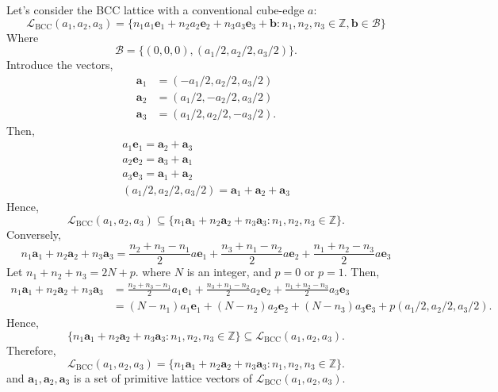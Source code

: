 \documentclass[a4paper,11pt]{article}
\begin{document}
Let's consider the BCC lattice with a conventional cube-edge $a$:
\begin{equation}
    \mathcal L_{\mathrm{BCC}}(a_1, a_2, a_3) = \{n_1a_1\mathbf e_1+n_2a_2\mathbf e_2+n_3a_3\mathbf e_3 + \mathbf b:n_1, n_2, n_3\in \mathbb Z, \mathbf b\in\mathcal B\}
\end{equation}
Where
\begin{equation}
    \mathcal B=\{(0, 0, 0), (a_1/2, a_2/2, a_3/2)\}.
\end{equation}
Introduce the vectors,
\begin{align}
    \mathbf a_1&=(-a_1/2, a_2/2, a_3/2)\\
    \mathbf a_2&=(a_1/2, -a_2/2, a_3/2)\\
    \mathbf a_3&=(a_1/2, a_2/2, -a_3/2).
\end{align}
Then,
\begin{gather}
    a_1\mathbf e_1 = \mathbf a_2 + \mathbf a_3\\
    a_2\mathbf e_2 = \mathbf a_3 + \mathbf a_1\\
    a_3\mathbf e_3 = \mathbf a_1 + \mathbf a_2\\
    (a_1/2, a_2/2, a_3/2) = \mathbf a_1 + \mathbf a_2 + \mathbf a_3
\end{gather}
Hence,
\begin{equation}
    \mathcal L_{\mathrm{BCC}}(a_1, a_2, a_3)\subseteq \{n_1\mathbf a_1+n_2\mathbf a_2+n_3\mathbf a_3:n_1, n_2, n_3\in\mathbb Z\}.
\end{equation}
Conversely,
\begin{equation}
    n_1\mathbf a_1+n_2\mathbf a_2+n_3\mathbf a_3
    =\frac{n_2 + n_3 - n_1}{2}a\mathbf e_1+\frac{n_3 + n_1 - n_2}{2}a\mathbf e_2 + \frac{n_1 + n_2 - n_3}{2}a\mathbf e_3
\end{equation}
Let $n_1 + n_2 + n_3 = 2N + p$. where $N$ is an integer, and $p=0$ or $p=1$. Then,
\begin{align}
    n_1\mathbf a_1+n_2\mathbf a_2+n_3\mathbf a_3
    &=\frac{n_2 + n_3 - n_1}{2}a_1\mathbf e_1+\frac{n_3 + n_1 - n_2}{2}a_2\mathbf e_2 + \frac{n_1 + n_2 - n_3}{2}a_3\mathbf e_3\\
    &=(N - n_1)a_1\mathbf e_1+(N - n_2)a_2\mathbf e_2 + (N - n_3)a_3\mathbf e_3 + p(a_1/2, a_2/2, a_3/2).
\end{align}
Hence,
\begin{equation}
    \{n_1\mathbf a_1+n_2\mathbf a_2+n_3\mathbf a_3:n_1, n_2, n_3\in\mathbb Z\}\subseteq\mathcal L_{\mathrm{BCC}}(a_1, a_2, a_3).
\end{equation}
Therefore,
\begin{equation}
    \mathcal L_{\mathrm{BCC}}(a_1, a_2, a_3) = \{n_1\mathbf a_1+n_2\mathbf a_2+n_3\mathbf a_3:n_1, n_2, n_3\in\mathbb Z\}.
\end{equation}
and $\mathbf a_1, \mathbf a_2, \mathbf a_3$ is a set of primitive lattice vectors of $\mathcal L_{\mathrm{BCC}}(a_1, a_2, a_3)$.
\end{document}
